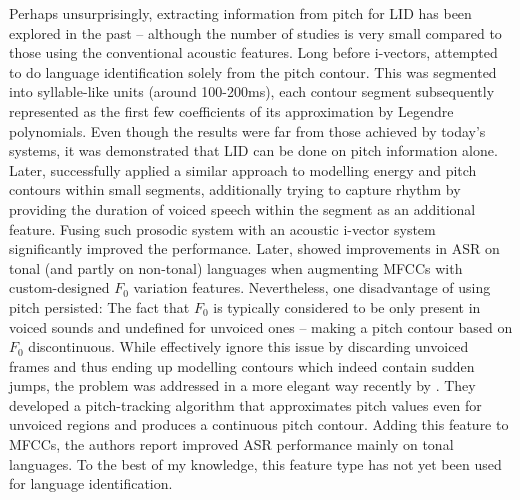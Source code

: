 \documentclass[bsc,frontabs,twoside,singlespacing,parskip,deptreport]{infthesis}
\begin{document}
{{{      %
      Perhaps unsurprisingly, extracting information from pitch for LID has been explored in the past -- although the number of studies is very small compared to those using the conventional acoustic features. Long before i-vectors, \citet{Lin_et_al_2005} attempted to do language identification solely from the pitch contour. This was segmented into syllable-like units (around 100-200ms), each contour segment subsequently represented as the first few coefficients of its approximation by Legendre polynomials. Even though the results were far from those achieved by today's systems, it was demonstrated that LID can be done on pitch information alone. Later, \citet{Martinez_et_al_2012} successfully applied a similar approach to modelling energy and pitch contours within small segments, additionally trying to capture rhythm by providing the duration of voiced speech within the segment as an additional feature. Fusing such prosodic system with an acoustic i-vector system significantly improved the performance. Later, \citet{Metze_et_al_2013} showed improvements in ASR on tonal (and partly on non-tonal) languages when augmenting MFCCs with custom-designed $F_0$ variation features. Nevertheless, one disadvantage of using pitch persisted: The fact that $F_0$ is typically considered to be only present in voiced sounds and undefined for unvoiced ones -- making a pitch contour based on $F_0$ discontinuous. While \citet{Martinez_et_al_2012} effectively ignore this issue by discarding unvoiced frames and thus ending up modelling contours which indeed contain sudden jumps, the problem was addressed in a more elegant way recently by \cite{Ghahremani_et_al_2014}. They developed a pitch-tracking algorithm that approximates pitch values even for unvoiced regions and produces a continuous pitch contour. Adding this feature to MFCCs, the authors report improved ASR performance mainly on tonal languages. To the best of my knowledge, this feature type has not yet been used for language identification.

}}}
\end{document}
